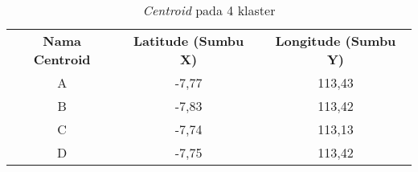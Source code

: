 \begin{table}[H]
\footnotesize
\centering
\begin{tabular}{ccc}
\rowcolor[HTML]{4472C4} 
{\color[HTML]{FFFFFF} \textbf{Nama   Centroid}} & {\color[HTML]{FFFFFF} \textbf{Latitude (Sumbu X)}} & {\color[HTML]{FFFFFF} \textbf{Longitude (Sumbu Y)}} \\
\rowcolor[HTML]{D9E1F2} 
A & -7,77 & 113,43 \\
B & -7,83 & 113,42 \\
\rowcolor[HTML]{D9E1F2} 
C & -7,74 & 113,13 \\
D & -7,75 & 113,42
\end{tabular}
\caption{\textit{Centroid} pada 4 klaster}
\label{tab:center4}
\end{table}	